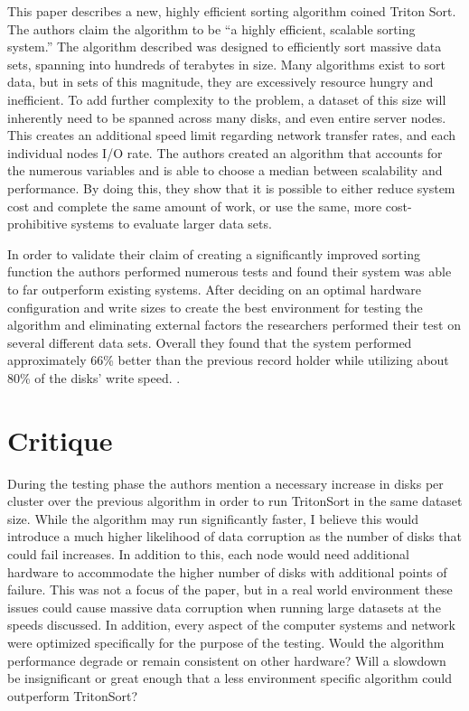 \documentclass[11pt]{article}
\begin{document}
This paper describes a new, highly efficient sorting algorithm coined Triton Sort. The authors claim the algorithm to be ``a highly efficient, scalable sorting system.'' \cite{Kapfhammer2013} The algorithm described was designed to efficiently sort massive data sets, spanning into hundreds of terabytes in size. Many algorithms exist to sort data, but in sets of this magnitude, they are excessively resource hungry and inefficient. To add further complexity to the problem, a dataset of this size will inherently need to be spanned across many disks, and even entire server nodes. This creates an additional speed limit regarding network transfer rates, and each individual nodes I/O rate. The authors created an algorithm that accounts for the numerous variables and is able to choose a median between scalability and performance. By doing this, they show that it is possible to either reduce system cost and complete the same amount of work, or use the same, more cost-prohibitive systems to evaluate larger data sets.

In order to validate their claim of creating a significantly improved sorting function the authors performed numerous tests and found their system was able to far outperform existing systems. After deciding on an optimal hardware configuration and write sizes to create the best environment for testing the algorithm and eliminating external factors the researchers performed  their test on several different data sets. Overall they found that the system performed approximately 66\% better than the previous record holder while utilizing about 80\% of the disks' write speed. \cite{Kapfhammer2013}.

\vspace*{-.1in}
\section{Critique}
\label{sec:critique}
\vspace*{-.1in}

During the testing phase the authors mention a necessary increase in disks per cluster over the previous algorithm in order to run TritonSort in the same dataset size. While the algorithm may run significantly faster, I believe this would introduce a much higher likelihood of data corruption as the number of disks that could fail increases. In addition to this, each node would need additional hardware to accommodate the higher number of disks with additional points of failure. This was not a focus of the paper, but in a real world environment these issues could cause massive data corruption when running large datasets at the speeds discussed. In addition, every aspect of the computer systems and network were optimized specifically for the purpose of the testing. Would the algorithm performance degrade or remain consistent on other hardware? Will a slowdown be insignificant or great enough that a less environment specific algorithm could outperform TritonSort?
\end{document}
